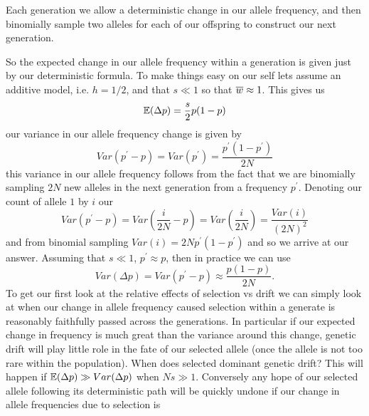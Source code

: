 
Each generation we allow a deterministic change in our
allele frequency, and then binomially sample two alleles for each of
our offspring to construct our next generation.


So the expected change in our allele frequency within a generation is given just by our
deterministic formula. To make things easy on our self lets assume an
additive model, i.e. $h=1/2$, and that $s \ll 1$ so that $\overline{w}
\approx 1$. This gives us
\begin{equation}
\mathbb{E}(\Delta p ) = \frac{s}{2} p(1-p) \label{eqn:WF_mean}
\end{equation}
our variance in our allele frequency change is given by
\begin{equation}
Var(p^{\prime} - p) = Var(p^{\prime}) = \frac{p^{\prime}(1-p^{\prime})}{2N}
\end{equation}
this variance in our allele frequency follows from the fact that we
are binomially sampling $2N$ new alleles in the next
generation from a frequency $p^{\prime}$. Denoting our count of allele $1$ by $i$ our
\begin{equation}
Var(p^{\prime} - p) = Var(\frac{i}{2N} - p) =  Var(\frac{i}{2N} ) =\frac{Var(i)}{(2N)^2}
\end{equation}
and from binomial sampling $Var(i) = 2N p^{\prime}(1-p^{\prime})$ and
so we arrive at our answer. Assuming that $s \ll 1$, $p^{\prime}
\approx p$, then in practice we can use
\begin{equation}
Var(\Delta p)  =Var(p^{\prime} - p) \approx \frac{p(1-p)}{2N}. \label{eqn:WF_var}
\end{equation}
To get our first look at the relative effects of selection vs drift we
can simply look at when our change in allele frequency caused
selection within a generate is reasonably faithfully passed across
the generations. In particular if our expected change in frequency is much
great than the variance around this change, genetic drift will play
little role in the fate of our selected allele (once the allele is not
too rare within the population). When does selected
dominant genetic drift? This will happen if $\mathbb{E}(\Delta p) \gg Var(\Delta p)$ when $Ns \gg 1$. Conversely any
hope of our selected allele following its deterministic path will be quickly undone if our change in allele frequencies due to selection is
